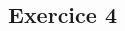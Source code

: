 \documentclass[10pt,fleqn]{book} %
\begin{document}
\begin{multicols}{2}
%
%
%
%
%
%
%
%

%
%
%


\section*{Exercice 4}
\setcounter{subparagraph}{0}


\end{multicols}
\end{document}
